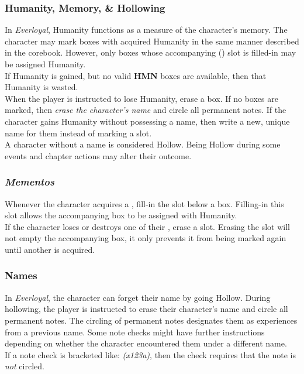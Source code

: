 \documentclass[12pt]{article}
\begin{document}
\begin{multicols*}{2}
\subsubsection{Humanity, Memory, \& Hollowing}
\hypertarget{HMN}{}\hypertarget{MEM}{}
In \emph{Everloyal}, Humanity functions as a measure of the character’s memory. The character may mark  boxes with acquired Humanity in the same manner described in the corebook. However, only  boxes whose accompanying  () slot is filled-in may be assigned Humanity.\\
If Humanity is gained, but no valid \textbf{HMN} boxes are available, then that Humanity is wasted.\\
When the player is instructed to lose Humanity, erase a  box. If no  boxes are marked, then \emph{erase the character’s name} and circle all permanent notes. If the character gains Humanity without possessing a name, then write a new, unique name for them instead of marking a  slot.\\
A character without a name is considered Hollow. Being Hollow during some events and chapter actions may alter their outcome.

\subsubsection{\emph{Mementos}}
\hypertarget{mementos}{}\hypertarget{memento}{}
Whenever the character acquires a , fill-in the  slot below a  box. Filling-in this slot allows the accompanying  box to be assigned with Humanity.\\
If the character loses or destroys one of their , erase a  slot. Erasing the  slot will not empty the accompanying  box, it only prevents it from being marked again until another  is acquired.

\subsubsection{Names}
In \emph{Everloyal}, the character can forget their name by going Hollow. During hollowing, the player is instructed to erase their character’s name and circle all permanent notes. The circling of permanent notes designates them as experiences from a previous name. Some note checks might have further instructions depending on whether the character encountered them under a different name.\\
If a note check is bracketed like: \emph{(x123a)}, then the check requires that the note is \emph{not} circled.

\end{multicols*}
\pagebreak
\end{document}
